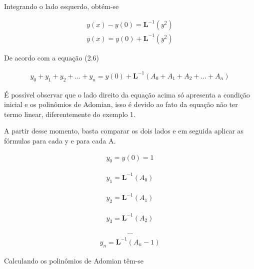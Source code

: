 Integrando o lado esquerdo, obtém-se

\begin{gather*}
 y(x) - y(0) = \textbf{L}^{-1}(y^2)
\end{gather*} 
\begin{gather*}
 y(x)  = y(0) + \textbf{L}^{-1}(y^2)
\end{gather*}

De acordo com a equação (2.6)


\begin{gather*}
  y_{0} +y_{1} + y_{2} + ... + y_{n}  =  y(0) + \textbf{L}^{-1}( A_{0} +A_{1} + A_{2} + ... + A_{n})
\end{gather*}
 
 É possível observar que o lado direito da equação acima só apresenta a condição inicial e os polinômios de Adomian, isso é devido ao fato da equação não ter termo linear, diferentemente do exemplo 1.
 
 A partir desse momento, basta comparar os dois lados e em seguida aplicar as fórmulas para cada y e para cada A.

\begin{gather*}
  y_{0} = y(0) = 1
\end{gather*}

\begin{gather*}
  y_{1} = \textbf{L}^{-1} (A_{0})
\end{gather*}

\begin{gather*}
  y_{2} = \textbf{L}^{-1} (A_{1})
\end{gather*}

\begin{gather*}
  y_{3} = \textbf{L}^{-1} (A_{2})
\end{gather*}

\begin{gather*}
  ...
\end{gather*}
\begin{gather*}
  y_{n} = \textbf{L}^{-1} (A_{n} - 1)
\end{gather*}

Calculando os polinômios de Adomian têm-se

